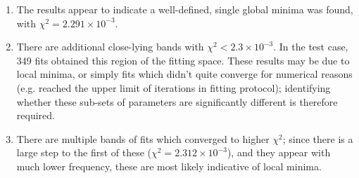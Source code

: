 \begin{enumerate}
\item The results appear to indicate a well-defined, single global minima was found, with $\chi^2 = 2.291\times10^{-3}$. 
\item There are additional close-lying bands with $\chi^2 < 2.3\times10^{-3}$. In the test case, 349 fits obtained this region of the fitting space. These results may be due to local minima, or simply fits which didn't quite converge for numerical reasons (e.g. reached the upper limit of iterations in fitting protocol); identifying whether these sub-sets of parameters are significantly different is therefore required.
\item There are multiple bands of fits which converged to higher $\chi^2$; since there is a large step to the first of these ($\chi^2 = 2.312\times10^{-3}$), and they appear with much lower frequency, these are most likely indicative of local minima.

\end{enumerate}


